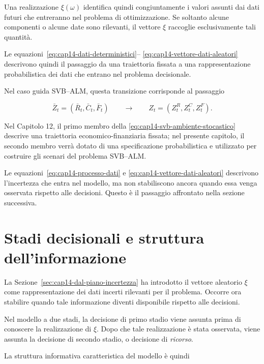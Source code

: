 Una realizzazione $\xi(\omega)$ identifica quindi congiuntamente i valori
assunti dai dati futuri che entreranno nel problema di ottimizzazione. Se
soltanto alcune componenti o alcune date sono rilevanti, il vettore $\xi$
raccoglie esclusivamente tali quantit\`a.

Le equazioni~\eqref{eq:cap14-dati-deterministici}--%
\eqref{eq:cap14-vettore-dati-aleatori} descrivono quindi il passaggio da una
traiettoria fissata a una rappresentazione probabilistica dei dati che
entrano nel problema decisionale.

Nel caso guida SVB--ALM, questa transizione corrisponde al passaggio

\begin{equation}
\bar Z_t=(\bar R_t,\bar C_t,\bar F_t)
\qquad\longrightarrow\qquad
Z_t=(Z_t^R,Z_t^C,Z_t^F).
\label{eq:cap14-svb-ambiente-stocastico}
\end{equation}

Nel Capitolo 12, il primo membro della
\eqref{eq:cap14-svb-ambiente-stocastico} descrive una traiettoria
economico-finanziaria fissata; nel presente capitolo, il secondo membro verr\`a
dotato di una specificazione probabilistica e utilizzato per costruire gli
scenari del problema SVB--ALM.

Le equazioni~\eqref{eq:cap14-processo-dati} e
\eqref{eq:cap14-vettore-dati-aleatori} descrivono l'incertezza che entra nel
modello, ma non stabiliscono ancora quando essa venga osservata rispetto alle
decisioni. Questo \`e il passaggio affrontato nella sezione successiva.

\section{Stadi decisionali e struttura dell'informazione}

\label{sec:cap14-stadi-informazione}

La Sezione~\ref{sec:cap14-dal-piano-incertezza} ha introdotto il vettore
aleatorio $\xi$ come rappresentazione dei dati incerti rilevanti per il
problema. Occorre ora stabilire quando tale informazione diventi disponibile
rispetto alle decisioni.

Nel modello a due stadi, la decisione di primo stadio viene assunta prima di
conoscere la realizzazione di $\xi$. Dopo che tale realizzazione \`e stata
osservata, viene assunta la decisione di secondo stadio, o decisione di
\emph{ricorso}.

La struttura informativa caratteristica del modello \`e quindi

